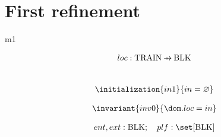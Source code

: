 \documentclass[12pt]{amsart}
\begin{document}
\section{First refinement}
\begin{machine}{m1}





\begin{use:set}{\Blk} \end{use:set}
\begin{use:fun}{\Train}{\Blk} \end{use:fun}


\begin{align*}
\variable{	loc : \Train \pfun \Blk}
\end{align*}


%

%

\begin{align*}
\\ \initialization{in1}
	{ in = \emptyset }
\end{align*}


\begin{align*}
\invariant{inv0}
	{	\dom.loc = in }
\end{align*}

\begin{align*}
\constant{	ent,ext : \Blk} ; \quad
\constant{	plf : \set [ \Blk ]}
\end{align*}


\end{machine}
\end{document}
